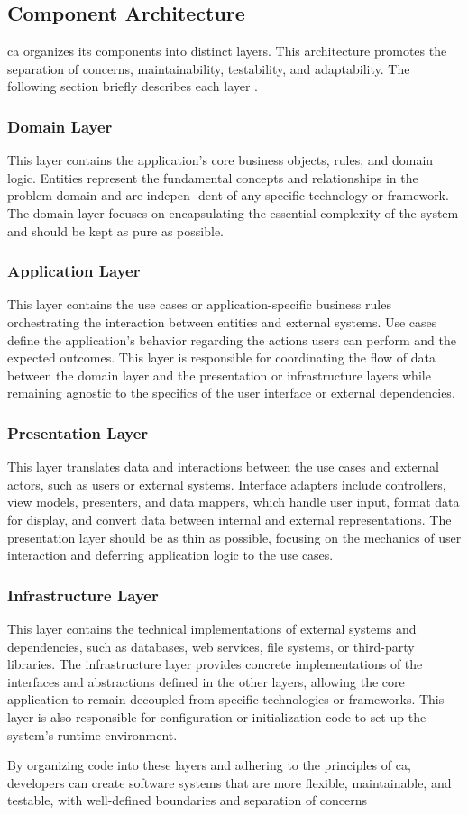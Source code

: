 \subsection{Component Architecture} \label{subsec_layers}

\gls{ca} organizes its components into distinct layers. This architecture promotes the
separation of concerns, maintainability, testability, and adaptability. The following
section briefly describes each layer \parencite{robert_c_martin_clean_2018}.

\subsubsection{Domain Layer}
This layer contains the application's core business objects, rules, and domain logic. Entities
represent the fundamental concepts and relationships in the problem domain and are indepen-
dent of any specific technology or framework. The domain layer focuses on encapsulating the
essential complexity of the system and should be kept as pure as possible.

\subsubsection{Application Layer}
This layer contains the use cases or application-specific business rules orchestrating the
interaction between entities and external systems. Use cases define the application's
behavior regarding the actions users can perform and the expected outcomes. This layer is
responsible for coordinating the flow of data between the domain layer and the
presentation or infrastructure layers while remaining agnostic to the specifics of the
user interface or external dependencies.

\subsubsection{Presentation Layer}
This layer translates data and interactions between the use cases and external actors,
such as users or external systems. Interface adapters include controllers, view models,
presenters, and data mappers, which handle user input, format data for display, and
convert data between internal and external representations. The presentation layer should
be as thin as possible, focusing on the mechanics of user interaction and deferring
application logic to the use cases.

\subsubsection{Infrastructure Layer}
This layer contains the technical implementations of external systems and dependencies,
such as databases, web services, file systems, or third-party libraries. The
infrastructure layer provides concrete implementations of the interfaces and abstractions
defined in the other layers, allowing the core application to remain decoupled from
specific technologies or frameworks. This layer is also responsible for configuration or
initialization code to set up the system's runtime environment.

By organizing code into these layers and adhering to the principles of \gls{ca},
developers can create software systems that are more flexible, maintainable, and testable,
with well-defined boundaries and separation of concerns